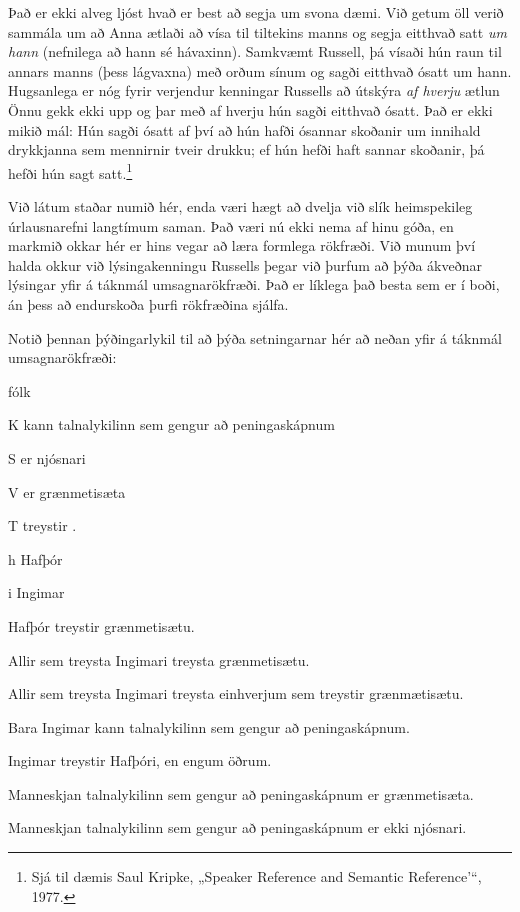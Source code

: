 Það er ekki alveg ljóst hvað er best að segja um svona dæmi. Við getum öll verið sammála um að Anna ætlaði að vísa til tiltekins manns og segja eitthvað satt \emph{um hann} (nefnilega að hann sé hávaxinn). Samkvæmt Russell, þá vísaði hún raun til annars manns (þess lágvaxna) með orðum sínum og sagði eitthvað ósatt um hann. Hugsanlega er nóg fyrir verjendur kenningar Russells að útskýra \emph{af hverju} ætlun Önnu gekk ekki upp og þar með af hverju hún sagði eitthvað ósatt. Það er ekki mikið mál: Hún sagði ósatt af því að hún hafði ósannar skoðanir um innihald drykkjanna sem mennirnir tveir drukku; ef hún hefði haft sannar skoðanir, þá hefði hún sagt satt.\footnote{Sjá til dæmis Saul Kripke, „Speaker Reference and Semantic Reference'“, 1977.}

Við látum staðar numið hér, enda væri hægt að dvelja við slík heimspekileg úrlausnarefni langtímum saman. Það væri nú ekki nema af hinu góða, en markmið okkar hér er hins vegar að læra formlega rökfræði. Við munum því halda okkur við lýsingakenningu Russells þegar við þurfum að þýða ákveðnar lýsingar yfir á táknmál umsagnarökfræði. Það er líklega það besta sem er í boði, án þess að endurskoða þurfi rökfræðina sjálfa.

\practiceproblems

\problempart
Notið þennan þýðingarlykil til að þýða setningarnar hér að neðan yfir á táknmál umsagnarökfræði:
\begin{ekey}
\item[\text{yfirgrip}] fólk
\item[K]  kann talnalykilinn sem gengur að peningaskápnum
\item[S]  er njósnari
\item[V]  er grænmetisæta
\item[T]  treystir .
\item[h] Hafþór
\item[i] Ingimar
\end{ekey}
\begin{earg}
\item Hafþór treystir grænmetisætu.
\item Allir sem treysta Ingimari treysta grænmetisætu.
\item Allir sem treysta Ingimari treysta einhverjum sem treystir grænmætisætu.
\item Bara Ingimar kann talnalykilinn sem gengur að peningaskápnum.
\item Ingimar treystir Hafþóri, en engum öðrum.
\item Manneskjan talnalykilinn sem gengur að peningaskápnum er grænmetisæta.
\item Manneskjan talnalykilinn sem gengur að peningaskápnum er ekki njósnari.
\end{earg}

